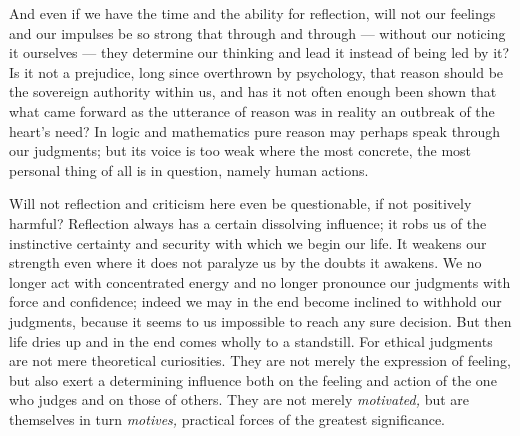 \documentclass[12pt,a4paper,openany]{book}
\newcommand{\opage}[1]{\marginnote{\footnotesize\textit{[#1]}}}
\begin{document}
And even if we have the time and the ability for reflection, will not our feelings and our
impulses be so strong that through and through --- without our noticing it ourselves --- they
determine our thinking and lead it instead of being led by it? Is it not a prejudice, long since
overthrown by psychology, that reason should be the sovereign authority within us, and has it not
often enough been shown that what came forward as the utterance of reason was in reality an
outbreak of the heart's need? In logic and mathematics pure reason may perhaps speak through our
judgments; but its voice is too weak where the most concrete, the most personal thing of all is in
question, namely human actions.

Will not reflection and criticism here even be questionable, if not positively harmful? Reflection
always has a certain dissolving influence; it robs us of the instinctive certainty and security
with which we begin our life. It weakens our strength even where it does not paralyze us by the
doubts it awakens. We no longer act with concentrated energy and no
\opage{5}longer pronounce our judgments with force and confidence; indeed we may in the end become
inclined to withhold our judgments, because it seems to us impossible to reach any sure decision.
But then life dries up and in the end comes wholly to a standstill. For ethical judgments are not
mere theoretical curiosities. They are not merely the expression of feeling, but also exert a
determining influence both on the feeling and action of the one who judges and on those of others.
They are not merely \textit{motivated,} but are themselves in turn \textit{motives,} practical forces of
the greatest significance.
\end{document}
